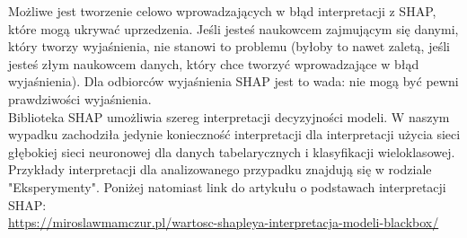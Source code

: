 Możliwe jest tworzenie celowo wprowadzających w błąd interpretacji z SHAP, które mogą ukrywać uprzedzenia. Jeśli jesteś naukowcem zajmującym się danymi, który tworzy wyjaśnienia, nie stanowi to problemu (byłoby to nawet zaletą, jeśli jesteś złym naukowcem danych, który chce tworzyć wprowadzające w błąd wyjaśnienia). Dla odbiorców wyjaśnienia SHAP jest to wada: nie mogą być pewni prawdziwości wyjaśnienia. \cite{shap} \\

Biblioteka SHAP umożliwia szereg interpretacji decyzyjności modeli. W naszym wypadku zachodziła jedynie konieczność interpretacji dla interpretacji użycia sieci głębokiej sieci neuronowej dla danych tabelarycznych i klasyfikacji wieloklasowej. Przykłady interpretacji dla analizowanego przypadku znajdują się w rodziale "Eksperymenty". Poniżej natomiast link do artykułu o podstawach interpretacji SHAP:\\
\url{https://miroslawmamczur.pl/wartosc-shapleya-interpretacja-modeli-blackbox/}
